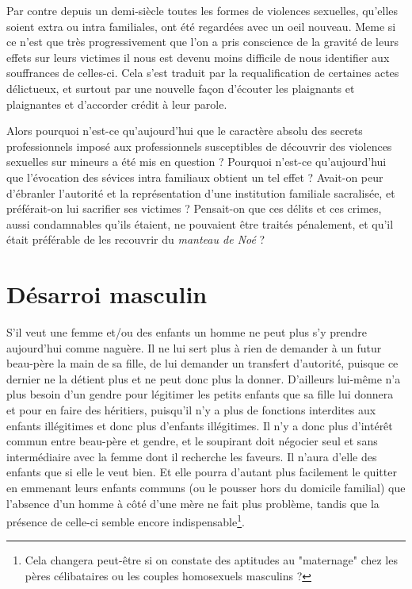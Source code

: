 Par contre depuis un demi-siècle toutes les formes de violences sexuelles, qu'elles soient extra ou intra familiales, ont été regardées avec un oeil nouveau. Meme si ce n'est que très progressivement que l'on a pris conscience de la gravité de leurs effets sur leurs victimes il nous est devenu moins difficile de nous identifier aux souffrances de celles-ci. Cela s'est traduit par la requalification de certaines actes délictueux, et surtout par une nouvelle façon d'écouter les plaignants et plaignantes et d'accorder crédit à leur parole.  
 

 Alors pourquoi n'est-ce qu'aujourd'hui que le caractère absolu des secrets professionnels imposé aux professionnels susceptibles de découvrir des violences sexuelles sur mineurs a été mis en question ? Pourquoi n'est-ce qu'aujourd'hui que l'évocation des sévices intra familiaux obtient un tel effet ? Avait-on peur d'ébranler l'autorité et la représentation d'une institution familiale sacralisée, et préférait-on lui sacrifier ses victimes ? Pensait-on que ces délits et ces crimes, aussi condamnables qu'ils étaient, ne pouvaient être traités pénalement, et qu'il était préférable de les recouvrir du \emph{manteau de Noé} ? 
 
 
 \section{Désarroi masculin}


 
S'il veut une femme et/ou des enfants un homme ne peut plus s'y prendre aujourd'hui comme naguère. Il ne lui sert plus à rien de demander à un futur beau-père la main de sa fille, de lui demander un transfert d'autorité, puisque ce dernier ne la détient plus et ne peut donc plus la donner. D'ailleurs lui-même n'a plus besoin d'un gendre pour légitimer les petits enfants que sa fille lui donnera et pour en faire des héritiers, puisqu'il n'y a plus de fonctions interdites aux enfants illégitimes et donc plus d'enfants illégitimes. Il n'y a donc plus d'intérêt commun entre beau-père et gendre, et le soupirant doit négocier seul et sans intermédiaire avec la femme dont il recherche les faveurs. Il n'aura d'elle des enfants que si elle le veut bien. Et elle pourra d'autant plus facilement le quitter en emmenant leurs enfants communs (ou le pousser hors du domicile familial) que l'absence d'un homme à côté d'une mère ne fait plus problème, tandis que la présence de celle-ci semble encore indispensable\footnote{Cela changera peut-être si on constate des aptitudes au "maternage" chez les pères célibataires ou les couples homosexuels masculins ?}. 
 
